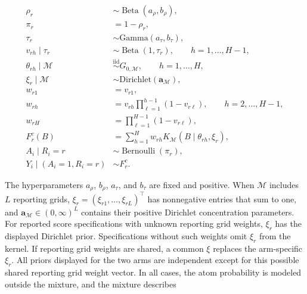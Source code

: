 \documentclass[11pt]{article}
\DeclareMathOperator{\Bernoulli}{Bernoulli}
\DeclareMathOperator{\Beta}{Beta}
\begin{document}
\begin{model}[H]
\centering
\begin{minipage}{0.95\linewidth}
\begin{equation*}
\begin{aligned}
  \rho_r
  &\sim \Beta(a_{\rho}, b_{\rho}),\\
  \pi_r
  &= 1 - \rho_r,\\
  \tau_r
  &\sim \mathrm{Gamma}(a_{\tau}, b_{\tau}),\\
  v_{rh} \mid \tau_r
  &\sim \Beta(1,\tau_r),
  \qquad
  h = 1,\ldots,H-1,\\
  \theta_{rh} \mid \mathcal{M}
  &\stackrel{\mathrm{iid}}{\sim} G_{0,\mathcal{M}},
  \qquad
  h = 1,\ldots,H,\\
  \xi_r \mid \mathcal{M}
  &\sim \mathrm{Dirichlet}(\mathbf a_{\mathcal{M}}),\\
  w_{r1}
  &= v_{r1},\\
  w_{rh}
  &= v_{rh}\prod_{\ell=1}^{h-1}(1-v_{r\ell}),
  \qquad
  h = 2,\ldots,H-1,\\
  w_{rH}
  &= \prod_{\ell=1}^{H-1}(1-v_{r\ell}),\\
  F_r^c(B)
  &= \sum_{h=1}^{H}
  w_{rh}K_{\mathcal{M}}(B \mid \theta_{rh},\xi_r),\\
  A_i \mid R_i = r
  &\sim \Bernoulli(\pi_r),\\
  Y_i \mid (A_i = 1, R_i = r)
  &\sim F_r^c.
\end{aligned}
\end{equation*}
\end{minipage}
\caption{General unadjusted Bayesian hierarchy for a selected kernel specification $\mathcal{M}$. Rows involving $\xi_r$ apply only to specifications with unknown arm-specific reporting grid weights.}
\label{model:bayes-hierarchy}
\end{model}
The hyperparameters $a_\rho$, $b_\rho$, $a_\tau$, and $b_\tau$ are fixed and positive.
When $\mathcal{M}$ includes $L$ reporting grids, $\xi_r=(\xi_{r1},\ldots,\xi_{rL})^\top$ has nonnegative entries that sum to one, and $\mathbf a_{\mathcal{M}}\in(0,\infty)^L$ contains their positive Dirichlet concentration parameters.
For reported score specifications with unknown reporting grid weights, $\xi_r$ has the displayed Dirichlet prior. Specifications without such weights omit $\xi_r$ from the kernel. If reporting grid weights are shared, a common $\xi$
replaces the arm-specific $\xi_r$. All priors displayed for the two arms are
independent except for this possible shared reporting grid weight vector. In all cases,
the atom probability is modeled outside the mixture, and the mixture describes
\end{document}
